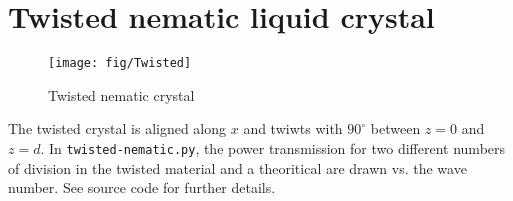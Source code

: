 \section{Twisted nematic liquid crystal}
\begin{figure}[!h]
\texttt{[image: fig/Twisted]}
\caption{\label{fig:Twisted} Twisted nematic crystal}
\end{figure}
The twisted crystal is aligned along $x$ and twiwts with  $90^\circ$ between $z=0$ and $z=d$.
In \verb/twisted-nematic.py/, the power transmission for two different numbers of division in the twisted material and a theoritical are drawn vs. the wave number. See source code for further details. 